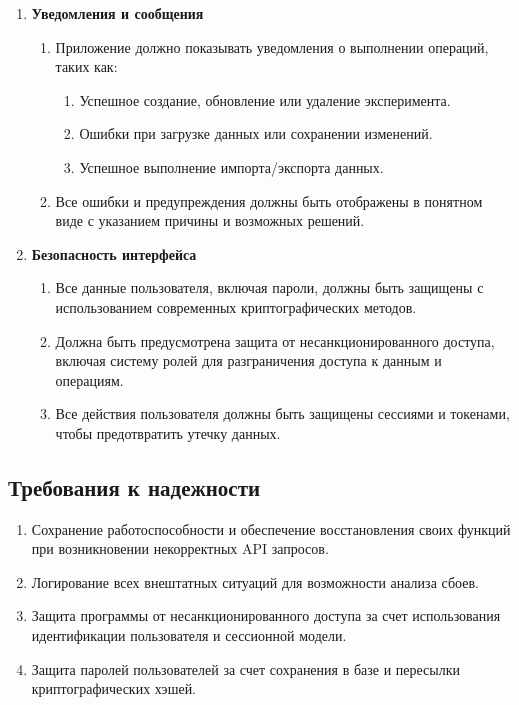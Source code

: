 \documentclass[a4paper,12pt,reqno]{article}
\begin{document}
\begin{enumerate}
        \item \textbf{Уведомления и сообщения}
        \begin{enumerate}[label=\arabic{enumi}.\arabic*.]
            \item Приложение должно показывать уведомления о выполнении операций, таких как:
            \begin{enumerate}[label=\arabic{enumi}.\arabic{enumii}.\arabic*.]
                \item Успешное создание, обновление или удаление эксперимента.
                \item Ошибки при загрузке данных или сохранении изменений.
                \item Успешное выполнение импорта/экспорта данных.
            \end{enumerate}
            \item Все ошибки и предупреждения должны быть отображены в понятном виде с указанием причины и возможных решений.
        \end{enumerate}

        \item \textbf{Безопасность интерфейса}
        \begin{enumerate}[label=\arabic{enumi}.\arabic*.]
            \item Все данные пользователя, включая пароли, должны быть защищены с использованием современных криптографических методов.
            \item Должна быть предусмотрена защита от несанкционированного доступа, включая систему ролей для разграничения доступа к данным и операциям.
            \item Все действия пользователя должны быть защищены сессиями и токенами, чтобы предотвратить утечку данных.
        \end{enumerate}
    \end{enumerate}

    \subsection{Требования к надежности}
    \begin{enumerate}
        \item Сохранение работоспособности и обеспечение восстановления своих функций при возникновении некорректных API запросов.
        \item Логирование всех внештатных ситуаций для возможности анализа сбоев.
        \item Защита программы от несанкционированного доступа за счет использования идентификации пользователя и сессионной модели.
        \item Защита паролей пользователей за счет сохранения в базе и пересылки криптографических хэшей.
    \end{enumerate}
\end{document}
